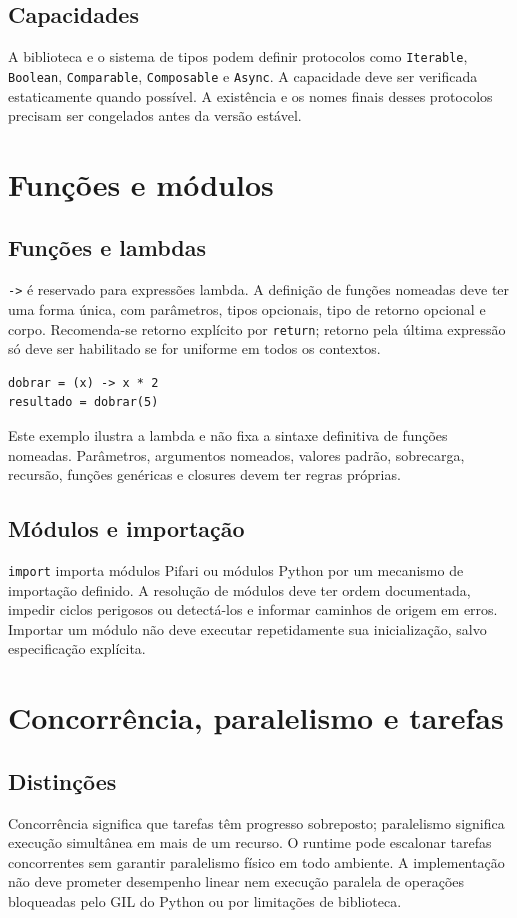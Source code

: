\documentclass[12pt,a4paper]{article}
\begin{document}
\subsection{Capacidades}
A biblioteca e o sistema de tipos podem definir protocolos como \texttt{Iterable}, \texttt{Boolean}, \texttt{Comparable}, \texttt{Composable} e \texttt{Async}. A capacidade deve ser verificada estaticamente quando possível. A existência e os nomes finais desses protocolos precisam ser congelados antes da versão estável.
\section{Funções e módulos}
\subsection{Funções e lambdas}
\texttt{->} é reservado para expressões lambda. A definição de funções nomeadas deve ter uma forma única, com parâmetros, tipos opcionais, tipo de retorno opcional e corpo. Recomenda-se retorno explícito por \texttt{return}; retorno pela última expressão só deve ser habilitado se for uniforme em todos os contextos.
\begin{lstlisting}
dobrar = (x) -> x * 2
resultado = dobrar(5)
\end{lstlisting}
Este exemplo ilustra a lambda e não fixa a sintaxe definitiva de funções nomeadas. Parâmetros, argumentos nomeados, valores padrão, sobrecarga, recursão, funções genéricas e closures devem ter regras próprias.
\subsection{Módulos e importação}
\texttt{import} importa módulos Pifari ou módulos Python por um mecanismo de importação definido. A resolução de módulos deve ter ordem documentada, impedir ciclos perigosos ou detectá-los e informar caminhos de origem em erros. Importar um módulo não deve executar repetidamente sua inicialização, salvo especificação explícita.
\section{Concorrência, paralelismo e tarefas}
\subsection{Distinções}
Concorrência significa que tarefas têm progresso sobreposto; paralelismo significa execução simultânea em mais de um recurso. O runtime pode escalonar tarefas concorrentes sem garantir paralelismo físico em todo ambiente. A implementação não deve prometer desempenho linear nem execução paralela de operações bloqueadas pelo GIL do Python ou por limitações de biblioteca.
\end{document}
